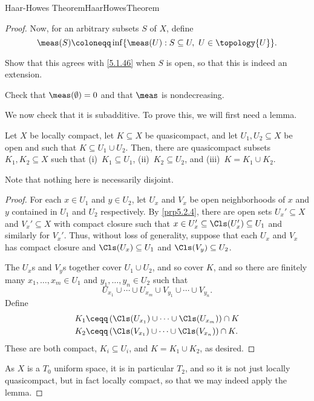 \begin{thm}{Haar-Howes Theorem}{HaarHowesTheorem}
\begin{proof}
Now, for an arbitrary subsets $S$ of $X$, define
\begin{equation}\label{5.1.38}
\meas (S)\coloneqq \inf \{ \meas (U):S\subseteq U,\ U\in \topology{U}\} .
\end{equation}
\begin{exr}[breakable=false]{}{}
Show that this agrees with \eqref{5.1.46} when $S$ is open, so that this is indeed an extension.
\end{exr}

\begin{exr}[breakable=false]{}{}
Check that $\meas (\emptyset )=0$ and that $\meas$ is nondecreasing.
\end{exr}

We now check that it is subadditive.  To prove this, we will first need a lemma.
\begin{lma}[breakable=false]{}{}
Let $X$ be locally compact, let $K\subseteq X$ be quasicompact, and let $U_1,U_2\subseteq X$ be open and such that $K\subseteq U_1\cup U_2$.  Then, there are quasicompact subsets $K_1,K_2\subseteq X$ such that (i)~$K_1\subseteq U_1$, (ii)~$K_2\subseteq U_2$, and (iii)~$K=K_1\cup K_2$.
\begin{rmk}
Note that nothing here is necessarily disjoint.
\end{rmk}
\begin{proof}
For each $x\in U_1$ and $y\in U_2$, let $U_x$ and $V_x$ be open neighborhoods of $x$ and $y$ contained in $U_1$ and $U_2$ respectively.  By \cref{prp5.2.4}, there are open sets $U_x'\subseteq X$ and $V_x'\subseteq X$ with compact closure such that $x\in U_x'\subseteq \Cls (U_x')\subseteq U_1$ and similarly for $V_x'$.  Thus, without loss of generality, suppose that each $U_x$ and $V_x$ has compact closure and $\Cls (U_x)\subseteq U_1$ and $\Cls (V_y)\subseteq U_2$.

The $U_x$s and $V_y$s together cover $U_1\cup U_2$, and so cover $K$, and so there are finitely many $x_1,\ldots ,x_m\in U_1$ and $y_1,\ldots ,y_n\in U_2$ such that
\begin{equation}
U_{x_1}\cup \cdots \cup U_{x_m}\cup V_{y_1}\cup \cdots \cup V_{y_n}.
\end{equation}
Define
{\small
\begin{subequations}
\begin{align}
K_1 & \ceqq \left( \Cls (U_{x_1})\cup \cdots \cup \Cls (U_{x_m})\right) \cap K \\
K_2 & \ceqq \left( \Cls (V_{x_1})\cup \cdots \cup \Cls (V_{x_n})\right) \cap K.
\end{align}
\end{subequations}
}
These are both compact, $K_i\subseteq U_i$, and $K=K_1\cup K_2$, as desired.
\end{proof}
\end{lma}
As $X$ is a $T_0$ uniform space, it is in particular $T_2$, and so it is not just locally quasicompact, but in fact locally compact, so that we may indeed apply the lemma.


\end{proof}
\end{thm}
